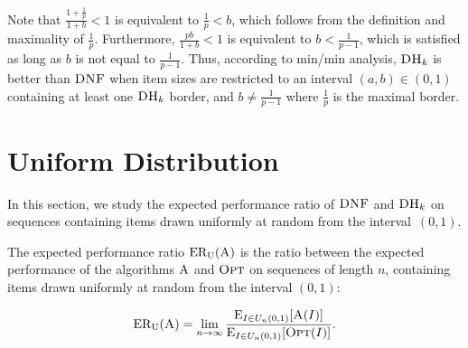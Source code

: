 \documentclass[11pt]{article}
\newcommand{\ALG}{\ensuremath{\operatorname{\textsc{A}}}\xspace}
\newcommand{\OPT}{\ensuremath{\operatorname{\textsc{Opt}}}\xspace}
\newcommand{\DNF}{\ensuremath{\operatorname{\textsc{DNF}}}\xspace}
\newcommand{\DHk}{{\ensuremath{\textsc{DH}_k}}\xspace}
\newcommand{\EXPDIST}[2]{\ensuremath{\operatorname{E}_{#1}[#2]}}
\newcommand{\ERU}[1]{\ensuremath{\mathrm{ER_U}(#1)}\xspace}
\newcommand{\p}{p}
\begin{document}
Note that $\frac{1+\frac{1}{\p}}{1+b}<1$ is equivalent to
$\frac{1}{\p}<b$, which follows from the definition and maximality of
$\frac{1}{\p}$.
Furthermore, $\frac{\p b}{1+b}<1$ is equivalent to $b<\frac{1}{\p -1}$,
which is satisfied as long as $b$ is not equal to $\frac{1}{\p -1}$.
Thus, according to min/min analysis, \DHk is better than \DNF when
item sizes are restricted to an interval $(a,b) \in (0,1)$ containing
at least one \DHk border, and $b\not=\frac{1}{\p -1}$ where $\frac{1}{\p}$ is the
maximal border.


\section{Uniform Distribution}

In this section, we study the expected performance ratio of \DNF and \DHk on sequences
containing items drawn uniformly at random from the interval~$(0,1)$.

The expected performance ratio $\ERU{\ALG}$ is the ratio between the expected performance of 
the algorithms \ALG and \OPT on sequences of length $n$, containing items drawn 
uniformly at random from the interval $(0,1)$:

$$\ERU{\ALG} = \lim_{n \rightarrow \infty}
  \frac{\EXPDIST{I\in U_n(0,1)}{\ALG(I)}}{\EXPDIST{I\in U_n(0,1)}{\OPT(I)}}.$$
\end{document}
